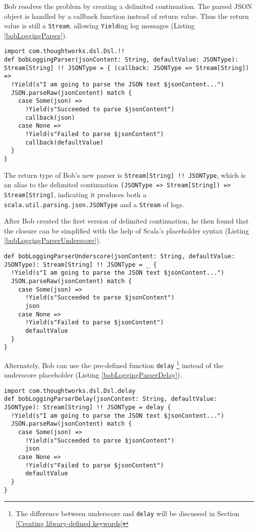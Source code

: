 Bob resolves the problem by creating a delimited continuation. The parsed JSON object is handled by a callback function instead of return value. Thus the return value is still a \lstinline{Stream}, allowing \lstinline{Yield}ing log messages (Listing \ref{bobLoggingParser}).

\begin{lstlisting}[caption={The implementation of Bob's logging parser},label={bobLoggingParser}]
import com.thoughtworks.dsl.Dsl.!!
def bobLoggingParser(jsonContent: String, defaultValue: JSONType): Stream[String] !! JSONType = { (callback: JSONType => Stream[String]) =>
  !Yield(s"I am going to parse the JSON text $jsonContent...")
  JSON.parseRaw(jsonContent) match {
    case Some(json) =>
      !Yield(s"Succeeded to parse $jsonContent")
      callback(json)
    case None =>
      !Yield(s"Failed to parse $jsonContent")
      callback(defaultValue)
  }
}
\end{lstlisting}

The return type of Bob's new parser is \lstinline{Stream[String] !! JSONType}, which is an alias to the delimited continuation \lstinline{(JSONType => Stream[String]) => Stream[String]}, indicating it produces both a \lstinline{scala.util.parsing.json.JSONType} and a \lstinline{Stream} of logs.

After Bob created the first version of delimited continuation, he then found that the closure can be simplified with the help of Scala's placeholder syntax (Listing \ref{bobLoggingParserUnderscore}).

\begin{lstlisting}[caption={The implementation of Bob's logging parser, the underscore placeholder version},label={bobLoggingParserUnderscore}]
def bobLoggingParserUnderscore(jsonContent: String, defaultValue: JSONType): Stream[String] !! JSONType = _ {
  !Yield(s"I am going to parse the JSON text $jsonContent...")
  JSON.parseRaw(jsonContent) match {
    case Some(json) =>
      !Yield(s"Succeeded to parse $jsonContent")
      json
    case None =>
      !Yield(s"Failed to parse $jsonContent")
      defaultValue
  }
}
\end{lstlisting}

Alternately, Bob can use the pre-defined function \lstinline{delay} \footnote{The difference between underscore and \lstinline{delay} will be discussed in Section \ref{Creating library-defined keywords}} instead of the underscore placeholder (Listing \ref{bobLoggingParserDelay}). 

\begin{lstlisting}[caption={The implementation of Bob's logging parser, the delay version},label={bobLoggingParserDelay}]
import com.thoughtworks.dsl.Dsl.delay
def bobLoggingParserDelay(jsonContent: String, defaultValue: JSONType): Stream[String] !! JSONType = delay {
  !Yield(s"I am going to parse the JSON text $jsonContent...")
  JSON.parseRaw(jsonContent) match {
    case Some(json) =>
      !Yield(s"Succeeded to parse $jsonContent")
      json
    case None =>
      !Yield(s"Failed to parse $jsonContent")
      defaultValue
  }
}
\end{lstlisting}

